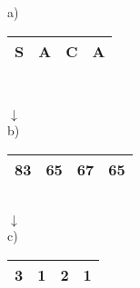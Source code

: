 \documentclass[convert={density=300,size=1080x800,outext=.png}, varwidth]{standalone}
\begin{document}
\begin{center}
a) \begin{tabular}{| c | c | c | c |}
\hline
S&A&C&A\\
\hline
\end{tabular}
\\
\vspace{5pt}

\hspace{14pt}$\downarrow$
\vspace{5pt}
\\
b) \begin{tabular}{| c | c | c | c |}
\hline
83& 65& 67& 65 \\ 
\hline
\end{tabular}
\\
\vspace{5pt}
\hspace{14pt}$\downarrow$
\vspace{5pt}
\\
c) \begin{tabular}{| c | c | c | c |}
\hline
3& 1& 2& 1 \\ 
\hline
\end{tabular}
\end{center}
\end{document}
